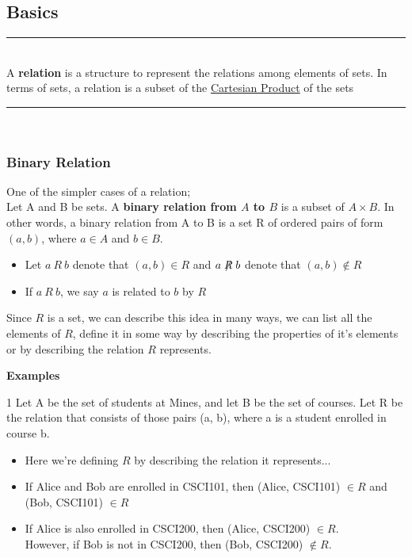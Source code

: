 \documentclass[12pt, letterpaper]{article}
\newcommand{\exheader}[1][ex]{{\tiny{#1}\normalsize}}
\newcommand{\horizline}[0]{\noindent\rule{\textwidth}{1pt}\\}
\begin{document}
\subsection{Basics}


	

\horizline
\faBook \space A \textbf{relation} is a structure to represent the relations among elements of sets. In terms of sets, a relation is a subset of the \hyperref[sec:cartproduct]{Cartesian Product} of the sets \\
\horizline

\subsubsection{Binary Relation}
One of the simpler cases of a relation; \\
Let A and B be sets. A \textbf{binary relation from $A$ to $B$} is a subset of $A \times B$. \smallbreak
In other words, a binary relation from A to B is a set R of ordered pairs of form $(a,b)$, where $a \in A$ and $b \in B$.
\begin{itemize}[leftmargin=*]
	\item[] Let $a\ R\ b$ denote that $(a,b) \in R$ and $a \centernot{R} b$ denote that $(a,b) \not \in R$
	\item[] If $a\ R\ b$, we say $a$ is related to $b$ by $R$
\end{itemize}

Since $R$ is a set, we can describe this idea in many ways, we can list all the elements of $R$, define it in some way by describing the properties of it's elements or by describing the relation $R$ represents.

\bigbreak

\textbf{Examples} \smallbreak

\exheader[1] Let A be the set of students at Mines, and let B be the set of courses. Let R be the relation that consists of those pairs (a, b), where a is a student enrolled in course b.
\begin{itemize}[leftmargin=*, label={}]
	\item Here we're defining $R$ by describing the relation it represents... 
	\item If Alice and Bob are enrolled in CSCI101, then (Alice, CSCI101) $\in R$ and (Bob, CSCI101) $\in R$
	\item If Alice is also enrolled in CSCI200, then (Alice, CSCI200) $\in R$. \\ However, if Bob is not in CSCI200, then (Bob, CSCI200) $\not \in R$.
\end{itemize}
\end{document}
